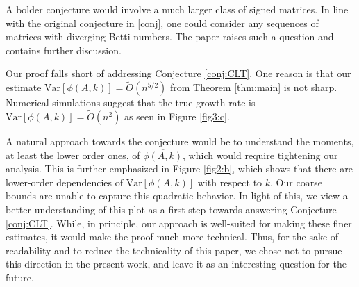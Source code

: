 \documentclass[reqno]{amsart}
\numberwithin{equation}{section}
\begin{document}
A bolder conjecture would involve a much larger class of signed matrices. In line with the original conjecture in \eqref{conj}, one could consider any sequences of matrices with diverging Betti numbers. The paper \cite{alon2025smooth} raises such a question and contains further discussion.

Our proof falls short of addressing Conjecture \ref{conj:CLT}. One reason is that our estimate $\mathrm{Var}\left[\phi(A,k) \right] = \tilde O(n^{5/2})$ from Theorem \ref{thm:main} is not sharp. Numerical simulations suggest that the true growth rate is $\mathrm{Var}\left[\phi(A,k) \right] = \tilde O(n^{2})$  as seen in Figure \ref{fig3:c}. 

A natural approach towards the conjecture would be to understand the moments, at least the lower order ones, of $\overline{\phi(A,k)}$, which would require tightening our analysis. This is further emphasized in Figure \ref{fig2:b}, which shows that there are lower-order dependencies of $\mathrm{Var}[\phi(A,k)]$ with respect to $k$. Our coarse bounds are unable to capture this quadratic behavior. In light of this, we view a better understanding of this plot as a first step towards answering Conjecture \ref{conj:CLT}. While, in principle, our approach is well-suited for making these finer estimates, it would make the proof much more technical. Thus, for the sake of readability and to reduce the technicality of this paper, we chose not to pursue this direction in the present work, and leave it as an interesting question for the future.
\end{document}

